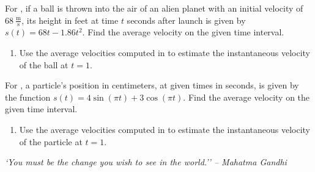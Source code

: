 \documentclass{book}
\begin{document}
For , if a ball is thrown into the air of an alien planet with an initial velocity of $68\ \frac{\text{m}}{\text{s}}$, its height in feet at time $t$ seconds after launch is given by $s(t) = 68t-1.86t^2$. Find the average velocity on the given time interval.
\begin{enumerate}[!HW!, label=$\spadesuit$ \arabic*., ref=\arabic*]
\item\label{exer:marsvelocity:extra} Use the average velocities computed in  to estimate the instantaneous velocity of the ball at $t=1$. 
\end{enumerate}

For , a particle's position in centimeters, at given times in seconds, is given by the function $s(t) = 4\sin(\pi t)+3\cos(\pi t)$. Find the average velocity on the given time interval.
\begin{enumerate}[!HW!, label=$\spadesuit$ \arabic*., ref=\arabic*]
\item Use the average velocities computed in  to estimate the instantaneous velocity of the particle at $t=1$. 
\end{enumerate}

\pagebreak
\begin{center} 
\emph{`You must be the change you wish to see in the world.'' -- Mahatma Gandhi}
\end{center}
\end{document}
